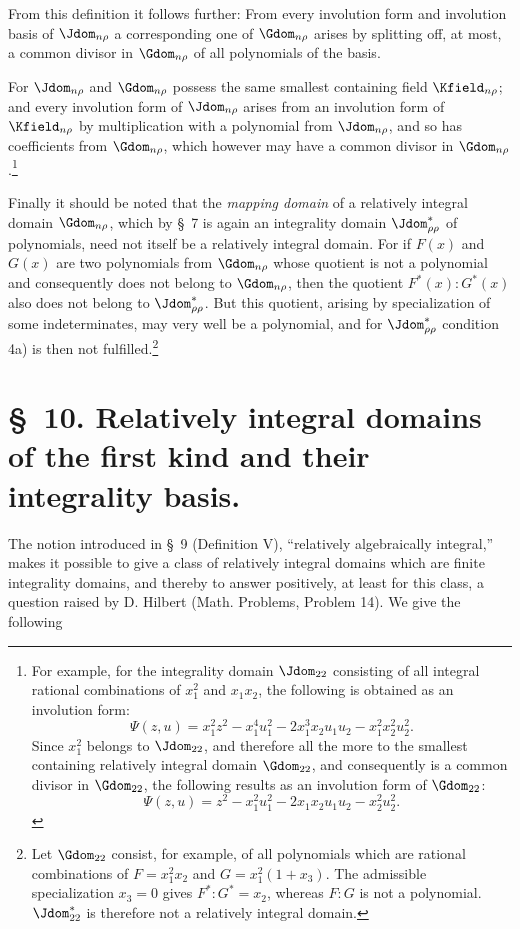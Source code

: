 \documentclass[11pt]{article}
\begin{document}
From this definition it follows further: From every involution form and involution basis of $\Jdom_{n\rho}$ a corresponding one of $\Gdom_{n\rho}$ arises by splitting off, at most, a common divisor in $\Gdom_{n\rho}$ of all polynomials of the basis.

For $\Jdom_{n\rho}$ and $\Gdom_{n\rho}$ possess the same smallest containing field $\Kfield_{n\rho}$; and every involution form of $\Jdom_{n\rho}$ arises from an involution form of $\Kfield_{n\rho}$ by multiplication with a polynomial from $\Jdom_{n\rho}$, and so has coefficients from $\Gdom_{n\rho}$, which however may have a common divisor in $\Gdom_{n\rho}$.\footnote{For example, for the integrality domain $\Jdom_{22}$ consisting of all integral rational combinations of $x_1^2$ and $x_1x_2$, the following is obtained as an involution form:
\[
\Psi(z,u)=x_1^2z^2-x_1^4u_1^2-2x_1^3x_2u_1u_2-x_1^2x_2^2u_2^2.
\]
Since $x_1^2$ belongs to $\Jdom_{22}$, and therefore all the more to the smallest containing relatively integral domain $\Gdom_{22}$, and consequently is a common divisor in $\Gdom_{22}$, the following results as an involution form of $\Gdom_{22}$:
\[
\Psi(z,u)=z^2-x_1^2u_1^2-2x_1x_2u_1u_2-x_2^2u_2^2.
\]}

Finally it should be noted that the \emph{mapping domain} of a relatively integral domain $\Gdom_{n\rho}$, which by \S\ 7 is again an integrality domain $\Jdom^*_{\rho\rho}$ of polynomials, need not itself be a relatively integral domain. For if $F(x)$ and $G(x)$ are two polynomials from $\Gdom_{n\rho}$ whose quotient is not a polynomial and consequently does not belong to $\Gdom_{n\rho}$, then the quotient $F^*(x):G^*(x)$ also does not belong to $\Jdom^*_{\rho\rho}$. But this quotient, arising by specialization of some indeterminates, may very well be a polynomial, and for $\Jdom^*_{\rho\rho}$ condition 4a) is then not fulfilled.\footnote{Let $\Gdom_{22}$ consist, for example, of all polynomials which are rational combinations of $F=x_1^2x_2$ and $G=x_1^2(1+x_3)$. The admissible specialization $x_3=0$ gives $F^*:G^*=x_2$, whereas $F:G$ is not a polynomial. $\Jdom^*_{22}$ is therefore not a relatively integral domain.}

\section*{\S\ 10. Relatively integral domains of the first kind and their integrality basis.}

The notion introduced in \S\ 9 (Definition V), ``relatively algebraically integral,'' makes it possible to give a class of relatively integral domains which are finite integrality domains, and thereby to answer positively, at least for this class, a question raised by D. Hilbert (Math. Problems, Problem 14). We give the following
\end{document}
